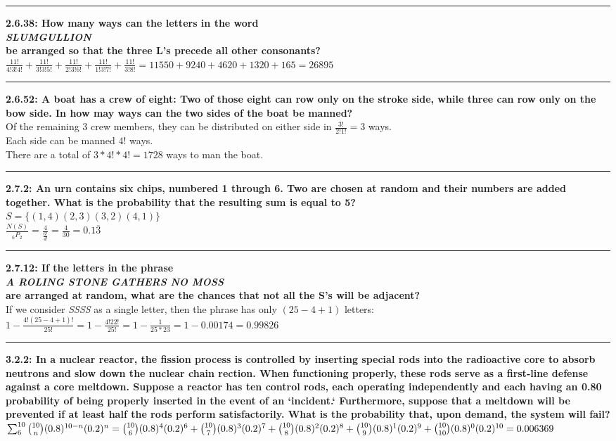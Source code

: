 \documentclass[11pt]{article}
\newcommand\question[2]{\vspace{.25in}\hrule\textbf{#1: #2}}
\begin{document}
\question{2.6.38}{How many ways can the letters in the word \\
\emph{SLUMGULLION} \\
be arranged so that the three L's precede all other consonants?}\\
$
\frac{11!}{4!3!4!} + 
\frac{11!}{3!3!5!} + 
\frac{11!}{2!3!6!} + 
\frac{11!}{1!3!7!} + 
\frac{11!}{3!8!}
=
11550 + 9240 + 4620 + 1320 + 165 = 26895
$


\question{2.6.52}{A boat has a crew of eight: Two of those eight can row only
on the stroke side, while three can row only on the bow side. In how may ways
can the two sides of the boat be manned?}\\
Of the remaining 3 crew members, they can be distributed on either side
in $\frac{3!}{2!1!}=3$ ways. \\
Each side can be manned $ 4! $ ways. \\
There are a total of $3*4!*4! = 1728$ ways to man the boat.

\question{2.7.2}{An urn contains six chips, numbered 1 through 6. Two are chosen
at random and their numbers are added together. What is the probability that the
resulting sum is equal to 5?}\\
$
S = \{
(1,4)
(2,3)
(3,2)
(4,1)
\}
$
\\
$\frac{N (S)}{_{6}P_{2}} = \frac{4}{\frac{6!}{4!}} = \frac{4}{30} = 0.1\overline{3}$


\question{2.7.12}{If the letters in the phrase \\
\emph{A ROLING STONE GATHERS NO MOSS} \\
are arranged at random, what are the chances that not all the S's will be adjacent?}\\
If we consider \emph{SSSS} as a single letter, then the phrase has only $ (25-4+1)$ letters:
\\
$
1 - \frac{4!(25-4+1)!}{25!} = 
1 - \frac{4!22!}{25!} = 
1 - \frac{1}{25*23} =
1 - 0.00174 = 0.99826
$



\question{3.2.2}{In a nuclear reactor, the fission process is controlled by 
inserting special rods into the radioactive core to absorb neutrons and slow
down the nuclear chain rection. When functioning properly, these rods serve
as a first-line defense against a core meltdown. Suppose a reactor has ten 
control rods, each operating independently and each having an 0.80 probability
of being properly inserted in the event of an `incident.` Furthermore, suppose
that a meltdown will be prevented if at least half the rods perform satisfactorily.
What is the probability that, upon demand, the system will fail?}\\
$\sum_{6}^{10} \binom{10}{n}(0.8)^{10-n} (0.2)^{n} = \\
\binom{10}{6}(0.8)^{4} (0.2)^{6} + 
\binom{10}{7}(0.8)^{3} (0.2)^{7} + 
\binom{10}{8}(0.8)^{2} (0.2)^{8} + 
\binom{10}{9}(0.8)^{1} (0.2)^{9} + 
\binom{10}{10}(0.8)^{0} (0.2)^{10} = \\
0.006369
$
\end{document}
